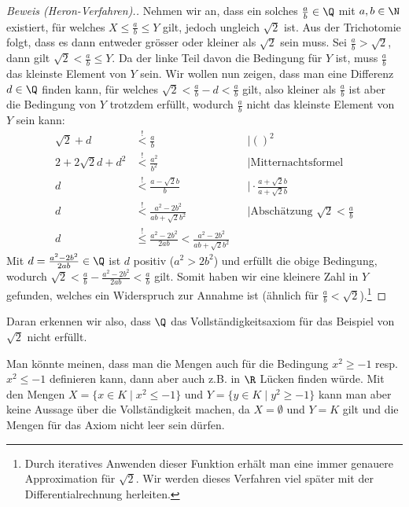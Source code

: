 \begin{example}
\begin{proof}[Beweis (Heron-Verfahren).]
Nehmen wir an, dass ein solches $\frac{a}{b} \in \Q$ mit $a,b \in \N$ existiert, für welches $X \leq \frac{a}{b} \leq Y$ gilt, jedoch ungleich $\sqrt{2}$ ist. Aus der Trichotomie folgt, dass es dann entweder grösser oder kleiner als $\sqrt{2}$ sein muss. Sei $\frac{a}{b} > \sqrt{2}$, dann gilt $\sqrt{2} < \frac{a}{b} \leq Y$. Da der linke Teil davon die Bedingung für $Y$ ist, muss $\frac{a}{b}$ das kleinste Element von $Y$ sein. Wir wollen nun zeigen, dass man eine Differenz $d \in \Q$ finden kann, für welches $\sqrt{2}< \frac{a}{b}-d<\frac{a}{b}$ gilt, also kleiner als $\frac{a}{b}$ ist aber die Bedingung von $Y$ trotzdem erfüllt, wodurch $\frac{a}{b}$ nicht das kleinste Element von $Y$ sein kann:
\begin{align*}
    \sqrt{2} + d &\stackrel{!}{<} \frac{a}{b} & &\mid ()^2\\
    2 + 2\sqrt{2}d + d^2 &\stackrel{!}{<}  \frac{a^2}{b^2} & & \mid \text{Mitternachtsformel}\\
    d &\stackrel{!}{<}  \frac{a-\sqrt{2}b}{b} && \mid \cdot \frac{a+\sqrt{2}b}{a+\sqrt{2}b}\\
    d &\stackrel{!}{<}  \frac{a^2 - 2 b^2}{ab+\sqrt{2}b^2} && \mid \text{Abschätzung } \sqrt{2} < \frac{a}{b}\\
    d &\stackrel{!}{\leq}  \frac{a^2 - 2 b^2}{2ab} < \frac{a^2 - 2 b^2}{ab+\sqrt{2}b^2} 
\end{align*}
Mit $d = \frac{a^2 - 2 b^2}{2ab} \in \Q$ ist $d$ positiv ($a^2 > 2b^2$) und erfüllt die obige Bedingung, wodurch $\sqrt{2} < \frac{a}{b}-\frac{a^2 - 2 b^2}{2ab} < \frac{a}{b}$ gilt. Somit haben wir eine kleinere Zahl in $Y$ gefunden, welches ein Widerspruch zur Annahme ist (ähnlich für $\frac{a}{b} < \sqrt{2}$).\footnote{Durch iteratives Anwenden dieser Funktion erhält man eine immer genauere Approximation für $\sqrt{2}$. Wir werden dieses Verfahren viel später mit der Differentialrechnung herleiten.}
\end{proof}
Daran erkennen wir also, dass $\Q$ das Vollständigkeitsaxiom für das Beispiel von $\sqrt{2}$ nicht erfüllt.
\end{example}

\begin{remark} Man könnte meinen, dass man die Mengen auch für die Bedingung $x^2 \geq -1$ resp. $x^2 \leq -1$ definieren kann, dann aber auch z.B. in $\R$ Lücken finden würde.
Mit den Mengen $X = \{x \in K \mid x^2 \leq -1 \}$ und $Y = \{y \in K \mid y^2 \geq -1 \}$ kann man aber keine Aussage über die Vollständigkeit machen, da $X = \emptyset$ und $Y = K$ gilt und die Mengen für das Axiom nicht leer sein dürfen.
\end{remark}

